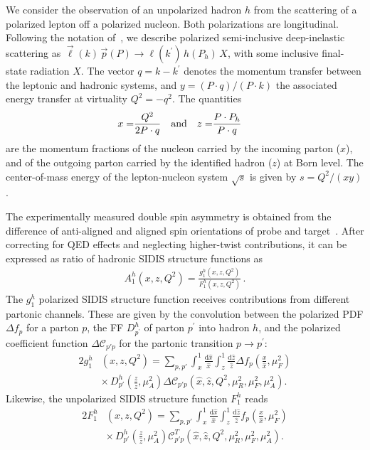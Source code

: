 \documentclass[10pt,aps,prl,twocolumn,preprintnumbers,nofootinbib]{revtex4-2}
\newcommand{\der}{\mathrm{d}}
\newcommand{\Ccal}{\mathcal{C}}
\newcommand{\hx}{\hat{x}}
\newcommand{\hz}{\hat{z}}
\begin{document}
We consider the observation of an unpolarized hadron $h$ from the scattering of a polarized lepton off a polarized nucleon. 
Both polarizations are longitudinal. Following the notation of~\cite{deFlorian:1997zj,Anderle:2013lka}, we describe polarized semi-inclusive deep-inelastic scattering as
$\vec{\ell}(k)\,\vec{p}(P)\to\ell(k^{\prime})\,h(P_h)\,X$, with some inclusive final-state
radiation $X$. The vector $q=k-k^{\prime}$ denotes the momentum transfer
between the leptonic and hadronic systems, and $y=(P\cdot
q)/(P\cdot k)$ the associated energy transfer at 
virtuality $Q^2=-q^2$. The quantities
\begin{align}
x=&\frac{Q^2}{2P\cdot q} & \rm{and}& &  z=&\frac{P\cdot P_h}{P\cdot q}
\end{align}
are the momentum fractions of the nucleon carried by the incoming parton
($x$), and of the outgoing parton carried by the identified
hadron ($z$) at Born level. The center-of-mass energy of the lepton-nucleon system  $\sqrt{s}$
is given by $s=Q^2/(xy)$.

The experimentally measured double spin asymmetry is obtained  
from the difference of anti-aligned and aligned spin orientations of probe and target~\cite{HERMES:2004zsh}. After correcting for QED effects and neglecting higher-twist contributions, it can be expressed as ratio of 
hadronic SIDIS structure functions as 
\begin{align}\label{eq:A1h}
A^h_1(x,z,Q^2)
= \frac{g^h_1(x,z,Q^2)}{F^h_1(x,z,Q^2)} \, .
\end{align}
The $g^h_1$ polarized SIDIS structure function 
receives contributions from different partonic channels. 
 These are given by the convolution
between the polarized PDF $\Delta f_p$ for a parton $p$, the FF $D^h_{p^{\prime}}$ of parton $p^{\prime}$ into hadron $h$, and the polarized coefficient function $\Delta \Ccal_{p' p}$ for the partonic
transition $p\to p^{\prime}$:
\begin{align}\label{eq:g1h}
  2g^h_1&(x,z,Q^2)= \sum_{p,p'} \int_x^1 \frac{\der\hx}{\hx}
  \int_z^1 \frac{\der\hz}{\hz} \Delta f_p\left(\frac{x}{\hx},\mu_F^2\right)
   \nonumber \\ 
  &\times\, D_{p'}^h\left(\frac{z}{\hz},\mu_A^2\right)  
 \Delta \Ccal_{p' p}\left(\hx,\hz,Q^2,\mu_R^2,\mu_F^2,\mu_A^2\right).
\end{align}
Likewise, the unpolarized SIDIS structure function $F_1^h$ reads
\begin{align}\label{eq:F1h}
  2F^h_1&(x,z,Q^2)= \sum_{p,p'} \int_x^1 \frac{\der\hx}{\hx}
  \int_z^1 \frac{\der\hz}{\hz} f_p\left(\frac{x}{\hx},\mu_F^2\right)
   \nonumber \\ 
  &\times\, D_{p'}^h\left(\frac{z}{\hz},\mu_A^2\right)  
  \Ccal^T_{p' p}\left(\hx,\hz,Q^2,\mu_R^2,\mu_F^2,\mu_A^2\right) . 
\end{align}
\end{document}
